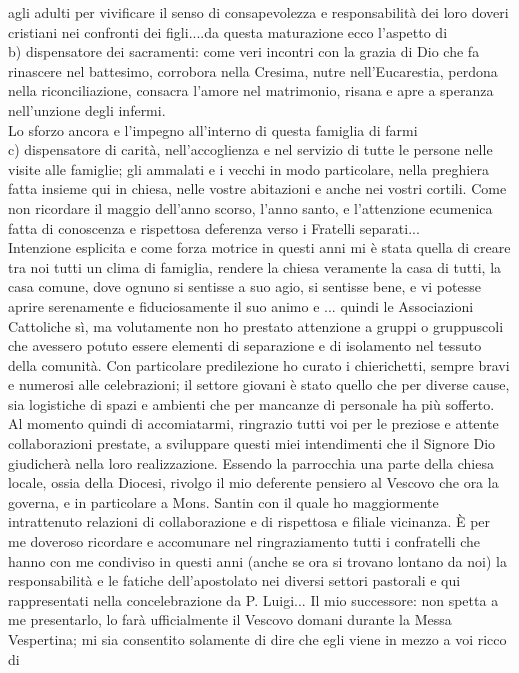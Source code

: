 agli adulti per vivificare il senso di consapevolezza e responsabilità dei loro doveri cristiani nei confronti dei figli....da questa maturazione ecco l'aspetto di\\
b) dispensatore dei sacramenti: come veri incontri con la grazia di Dio che fa rinascere nel battesimo, corrobora nella Cresima, nutre nell'Eucarestia, perdona nella riconciliazione, 
consacra l'amore nel matrimonio, risana e apre a speranza nell'unzione degli infermi.\\Lo sforzo ancora e l'impegno all'interno di questa famiglia di farmi\\
c) dispensatore di carità, nell'accoglienza e nel servizio di tutte le persone nelle visite alle famiglie; gli ammalati e i vecchi in modo particolare, nella preghiera fatta insieme qui in chiesa,
nelle vostre abitazioni e anche nei vostri cortili. Come non ricordare il maggio dell'anno scorso, l'anno santo, e l'attenzione ecumenica fatta di conoscenza 
e rispettosa deferenza verso i Fratelli separati...\\
Intenzione esplicita e come forza motrice in questi anni mi è stata quella di creare tra noi tutti un clima di famiglia, rendere la chiesa veramente la casa di tutti, la casa comune, dove ognuno si
sentisse a suo agio, si sentisse bene, e vi potesse aprire serenamente e fiduciosamente il suo animo e ...
quindi le Associazioni Cattoliche sì, ma volutamente non ho prestato attenzione a gruppi o gruppuscoli che avessero potuto essere elementi di separazione e di isolamento nel tessuto della
comunità. Con particolare predilezione ho curato i chierichetti, sempre bravi e numerosi alle celebrazioni; il settore giovani è stato quello che per diverse cause, 
sia logistiche di spazi e ambienti che per mancanze di personale ha più sofferto.
Al momento quindi di accomiatarmi, ringrazio tutti voi per le preziose e attente collaborazioni prestate, a sviluppare questi miei intendimenti che il Signore Dio giudicherà nella 
loro realizzazione.
Essendo la parrocchia una parte della chiesa locale, ossia della Diocesi, rivolgo il mio deferente pensiero al Vescovo che ora la governa, e in particolare a Mons. Santin con il quale
ho maggiormente intrattenuto relazioni di collaborazione e di rispettosa e filiale vicinanza.
È per me doveroso ricordare e accomunare nel ringraziamento tutti i confratelli che hanno con me condiviso in questi anni (anche se ora si trovano lontano da noi) 
la responsabilità e le fatiche dell'apostolato nei diversi settori pastorali e qui rappresentati nella concelebrazione da P. Luigi... 
Il mio successore: non spetta a me presentarlo, lo farà ufficialmente il Vescovo domani durante la Messa Vespertina; mi sia consentito solamente di dire che egli viene in mezzo a voi ricco di
